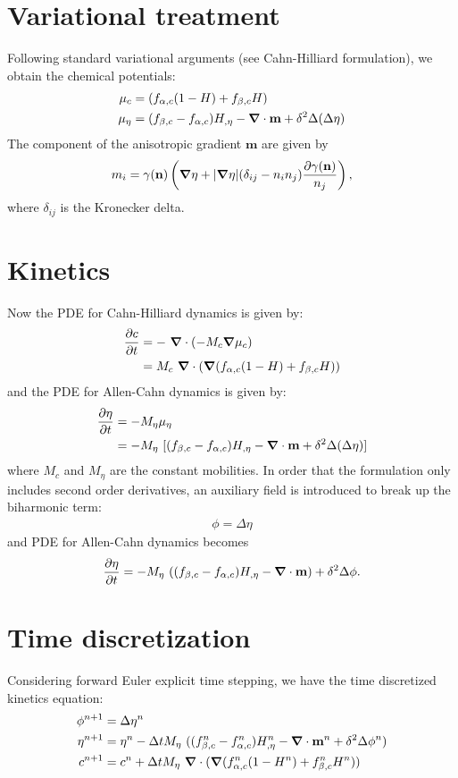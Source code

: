 \documentclass[10pt]{article}
\newcommand{\gv}[1]{\ensuremath{\mbox{\boldmath$ #1 $}}}
\newcommand{\grad}[1]{\gv{\nabla} #1}
\begin{document}
\section{Variational treatment}
Following standard variational arguments (see Cahn-Hilliard formulation), we obtain the chemical potentials:
\begin{align}
  \mu_{c}  &= (f_{\alpha,c}(1-H)+f_{\beta,c}H)  \\
  \mu_{\eta}  &= (f_{\beta,c}-f_{\alpha,c})H_{,\eta} - \grad \cdot \mathbf{m} + \delta^2 \Delta(\Delta \eta)
\end{align}
The component of the anisotropic gradient $\mathbf{m}$ are given by
\begin{equation}
m_i = \gamma(\mathbf{n}) \left( \grad \eta + |\grad \eta| (\delta_{ij}-n_i n_j) \frac{\partial \gamma (\mathbf{n})}{n_j} \right),
\end{equation}
where $\delta_{ij}$ is the Kronecker delta.

\section{Kinetics}
Now the PDE for Cahn-Hilliard dynamics is given by:
\begin{align}
  \frac{\partial c}{\partial t} &= -~\grad \cdot (-M_c\grad \mu_c)\\
  &=M_c~\grad \cdot (\grad (f_{\alpha,c}(1-H)+f_{\beta,c}H)) 
  \end{align}
  and the PDE for Allen-Cahn dynamics is given by:
  \begin{align}
    \frac{\partial \eta}{\partial t} &= -M_\eta \mu_\eta \\
  &=-M_\eta ~ [(f_{\beta,c}-f_{\alpha,c})H_{,\eta} - \grad \cdot \mathbf{m} + \delta^2 \Delta(\Delta \eta)]
\end{align}
where $M_c$ and $M_\eta$ are the constant mobilities.  In order that the formulation only includes second order derivatives, an auxiliary field is introduced to break up the biharmonic term:
\begin{align}
\phi = \Delta \eta
\end{align}
and PDE for Allen-Cahn dynamics becomes 
\begin{align}
    \frac{\partial \eta}{\partial t} =-M_\eta ~ ((f_{\beta,c}-f_{\alpha,c})H_{,\eta} - \grad \cdot \mathbf{m}) + \delta^2 \Delta \phi .
\end{align}

\section{Time discretization}
Considering forward Euler explicit time stepping, we have the time discretized kinetics equation:
\begin{align}
 \phi^{n+1} &= \Delta \eta^n \\
 \eta^{n+1} &= \eta^{n}  - \Delta t M_{\eta}~ ((f_{\beta,c}^n-f_{\alpha,c}^n)H_{,\eta}^n -  \grad \cdot \mathbf{m}^n + \delta^2 \Delta \phi^n) \\
c^{n+1} &= c^{n}  + \Delta t M_{\eta}~\grad \cdot (\grad (f_{\alpha,c}^n(1-H^{n})+f_{\beta,c}^n H^{n}))
\end{align}
\end{document}
